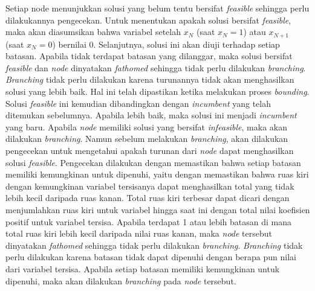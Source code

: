 Setiap node menunjukkan solusi yang belum tentu bersifat \textit{feasible} sehingga perlu dilakukannya pengecekan. Untuk menentukan apakah solusi bersifat \textit{feasible}, maka akan diasumsikan bahwa variabel setelah \(x_N\) (saat \(x_N=1\)) atau \(x_{N+1}\) (saat \(x_N=0\)) bernilai 0. Selanjutnya, solusi ini akan diuji terhadap setiap batasan. Apabila tidak terdapat batasan yang dilanggar, maka solusi bersifat \textit{feasible} dan \textit{node} dinyatakan \textit{fathomed} sehingga tidak perlu dilakukan \textit{branching}. \textit{Branching} tidak perlu dilakukan karena turunannya tidak akan menghasilkan solusi yang lebih baik. Hal ini telah dipastikan ketika melakukan proses \textit{bounding}. Solusi \textit{feasible} ini kemudian dibandingkan dengan \textit{incumbent} yang telah ditemukan sebelumnya. Apabila lebih baik, maka solusi ini menjadi \textit{incumbent} yang baru. Apabila \textit{node} memiliki solusi yang bersifat \textit{infeasible}, maka akan dilakukan \textit{branching}. Namun sebelum melakukan \textit{branching}, akan dilakukan pengecekan untuk mengetahui apakah turunan dari \textit{node} dapat menghasilkan solusi \textit{feasible}. Pengecekan dilakukan dengan memastikan bahwa setiap batasan memiliki kemungkinan untuk dipenuhi, yaitu dengan memastikan bahwa ruas kiri dengan kemungkinan variabel tersisanya dapat menghasilkan total yang tidak lebih kecil daripada ruas kanan. Total ruas kiri terbesar dapat dicari dengan menjumlahkan ruas kiri untuk variabel hingga saat ini dengan total nilai koefisien positif untuk variabel tersisa. Apabila terdapat 1 atau lebih batasan di mana total ruas kiri lebih kecil daripada nilai ruas kanan, maka \textit{node} tersebut dinyatakan \textit{fathomed} sehingga tidak perlu dilakukan \textit{branching}. \textit{Branching} tidak perlu dilakukan karena batasan tidak dapat dipenuhi dengan berapa pun nilai dari variabel tersisa. Apabila setiap batasan memiliki kemungkinan untuk dipenuhi, maka akan dilakukan \textit{branching} pada \textit{node} tersebut.

